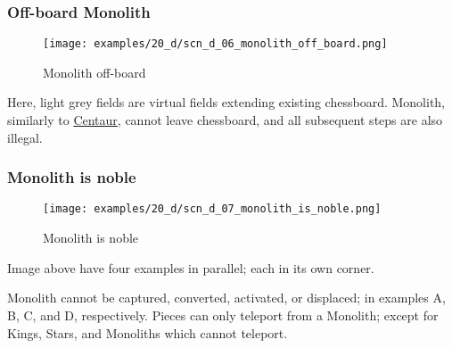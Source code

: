 \clearpage %

\subsubsection*{Off-board Monolith}
\label{sec:Discovery/Monolith/Movement/Off-board Monolith}

\vspace*{-1.4\baselineskip}
\noindent
\begin{figure}[!h]
\texttt{[image: examples/20\_d/scn\_d\_06\_monolith\_off\_board.png]}
\vspace*{-1.3\baselineskip}
\caption{Monolith off-board}
\label{fig:scn_d_06_monolith_off_board}
\end{figure}

\vspace*{-0.4\baselineskip}
Here, light grey fields are virtual fields extending existing chessboard.
Monolith, similarly to \hyperref[fig:scn_hd_06_centaur_off_board]{Centaur},
cannot leave chessboard, and all subsequent steps are also illegal.

\clearpage %

\subsubsection*{Monolith is noble}
\label{sec:Discovery/Monolith/Movement/Monolith is noble}

\vspace*{-1.4\baselineskip}
\noindent
\begin{figure}[!h]
\texttt{[image: examples/20\_d/scn\_d\_07\_monolith\_is\_noble.png]}
\vspace*{-1.3\baselineskip}
\caption{Monolith is noble}
\label{fig:scn_d_07_monolith_is_noble}
\end{figure}

\vspace*{-0.4\baselineskip}
Image above have four examples in parallel; each in its own corner.

Monolith cannot be captured, converted, activated, or displaced; in examples
A, B, C, and D, respectively. \newline
\indent
Pieces can only teleport from a Monolith; except for Kings, Stars, and
Monoliths which cannot teleport.

